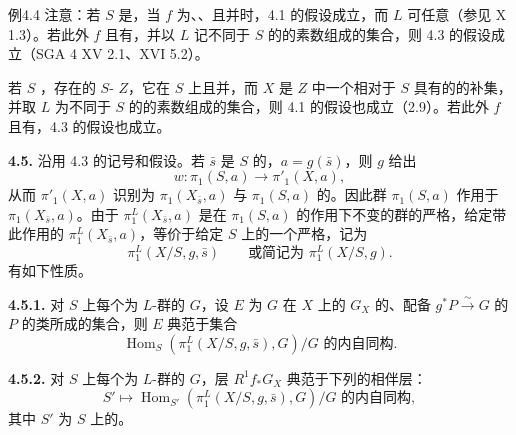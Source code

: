 \begin{SGAresult}{例}{4.4}
注意：若 $S$ 是，当 $f$ 为、、且并时，4.1 的假设成立，而 $L$ 可任意（参见 X 1.3）。若此外 $f$ 且有，并以 $L$ 记不同于 $S$ 的的素数组成的集合，则 4.3 的假设成立（SGA 4 XV 2.1、XVI 5.2）。

若 $S$ ，存在的 $S$- $Z$，它在 $S$ 上且并，而 $X$ 是 $Z$ 中一个相对于 $S$ 具有的的补集，并取 $L$ 为不同于 $S$ 的的素数组成的集合，则 4.1 的假设也成立（2.9）。若此外 $f$ 且有，4.3 的假设也成立。
\end{SGAresult}

\textbf{4.5.} 沿用 4.3 的记号和假设。若 $\bar s$ 是 $S$ 的，$a=g(\bar s)$，则 $g$ 给出
\[w:\pi_1(S,a)\longrightarrow\pi'_1(X,a),\]
从而 $\pi'_1(X,a)$ 识别为 $\pi_1(X_{\bar s},a)$ 与 $\pi_1(S,a)$ 的。因此群 $\pi_1(S,a)$ 作用于 $\pi_1(X_{\bar s},a)$。由于 $\pi_1^L(X_{\bar s},a)$ 是在 $\pi_1(S,a)$ 的作用下不变的群的严格，给定带此作用的 $\pi_1^L(X_{\bar s},a)$，等价于给定 $S$ 上的一个严格，记为
\[\pi_1^L(X/S,g,\bar s)\qquad\text{或简记为 }\pi_1^L(X/S,g).\]
有如下性质。

\textbf{4.5.1.} 对 $S$ 上每个为 $L$-群的 $G$，设 $E$ 为 $G$ 在 $X$ 上的 $G_X$ 的、配备 $g^*P\xrightarrow{\sim}G$ 的 $P$ 的类所成的集合，则 $E$ 典范于集合
\[\operatorname{Hom}_S(\pi_1^L(X/S,g,\bar s),G)\big/\text{$G$ 的内自同构}.\]

\textbf{4.5.2.} 对 $S$ 上每个为 $L$-群的 $G$，层 $R^1f_*G_X$ 典范于下列的相伴层：
\[S'\longmapsto\operatorname{Hom}_{S'}(\pi_1^L(X/S,g,\bar s),G)\big/\text{$G$ 的内自同构},\]
其中 $S'$ 为 $S$ 上的。

